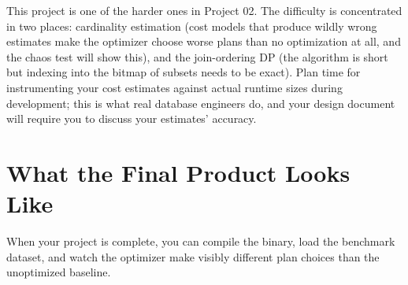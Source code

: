 \documentclass[11pt,a4paper]{article}
\begin{document}
This project is one of the harder ones in Project 02. The difficulty is concentrated in two places: cardinality estimation (cost models that produce wildly wrong estimates make the optimizer choose worse plans than no optimization at all, and the chaos test will show this), and the join-ordering DP (the algorithm is short but indexing into the bitmap of subsets needs to be exact). Plan time for instrumenting your cost estimates against actual runtime sizes during development; this is what real database engineers do, and your design document will require you to discuss your estimates' accuracy.

\section{What the Final Product Looks Like}

When your project is complete, you can compile the binary, load the benchmark dataset, and watch the optimizer make visibly different plan choices than the unoptimized baseline.
\end{document}

